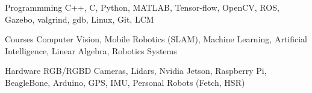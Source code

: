 

\begin{cvskills}

  \cvskill
    {Programmming} %
    {C++, C, Python, MATLAB, Tensor-flow, OpenCV, ROS, Gazebo, valgrind, gdb, Linux, Git, LCM} %

	\cvskill
	{Courses} %
	{Computer Vision, Mobile Robotics (SLAM), Machine Learning, Artificial Intelligence, Linear Algebra, Robotics Systems} %

	\cvskill
	{Hardware} %
	{RGB/RGBD Cameras, Lidars, Nvidia Jetson, Raspberry Pi, BeagleBone, Arduino, GPS, IMU, Personal Robots (Fetch, HSR)} %

\end{cvskills}
